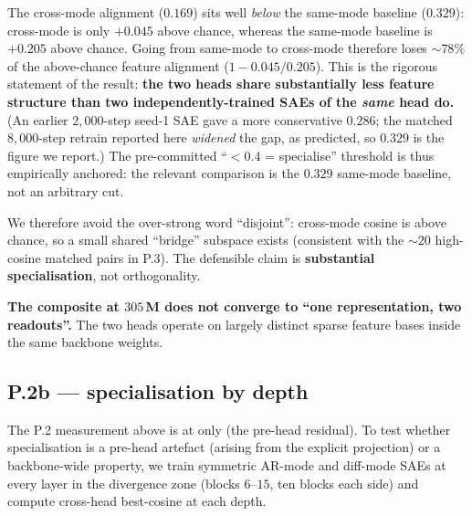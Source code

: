 \noindent The cross-mode alignment ($0.169$) sits well \emph{below}
the same-mode baseline ($0.329$): cross-mode is only $+0.045$ above
chance, whereas the same-mode baseline is $+0.205$ above chance. Going
from same-mode to cross-mode therefore loses $\sim\!78\%$ of the
above-chance feature alignment ($1 - 0.045/0.205$). This is the
rigorous statement of the result: \textbf{the two heads share
substantially less feature structure than two independently-trained
SAEs of the \emph{same} head do.} (An earlier $2{,}000$-step seed-1
SAE gave a more conservative $0.286$; the matched $8{,}000$-step
retrain reported here \emph{widened} the gap, as predicted, so $0.329$
is the figure we report.) The pre-committed ``$<\!0.4$ = specialise''
threshold is thus empirically anchored: the relevant comparison is the
$0.329$ same-mode baseline, not an arbitrary cut.

We therefore avoid the over-strong word ``disjoint'': cross-mode
cosine is above chance, so a small shared ``bridge'' subspace exists
(consistent with the $\sim\!20$ high-cosine matched pairs in P.3).
The defensible claim is \textbf{substantial specialisation}, not
orthogonality.

\textbf{The composite at $305$\,M does not converge to ``one
representation, two readouts''.} The two heads operate on largely
distinct sparse feature bases inside the same backbone weights.

\subsection{P.2b — specialisation by depth}
\label{sec:p2b}

The P.2 measurement above is at  only (the pre-head
residual). To test whether specialisation is a pre-head artefact
(arising from the explicit  projection) or a
backbone-wide property, we train symmetric AR-mode and diff-mode
SAEs at every layer in the divergence zone (blocks $6$--$15$, ten
blocks each side) and compute cross-head best-cosine at each depth.

